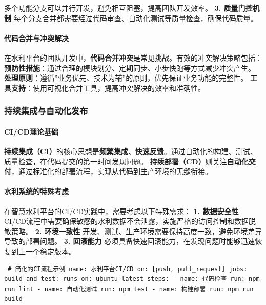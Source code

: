 多个功能分支可以并行开发，避免相互阻塞，提高团队开发效率。 \textbf{3. 质量门控机制} 每个分支合并都需要经过代码审查、自动化测试等质量检查，确保代码质量。 \paragraph{代码合并与冲突解决}\label{ux4ee3ux7801ux5408ux5e76ux4e0eux51b2ux7a81ux89e3ux51b3} 在水利平台的团队开发中，\textbf{代码合并冲突}是常见挑战。有效的冲突解决策略包括： \textbf{预防性措施}：通过合理的模块划分、定期同步、小步快跑等方式减少冲突产生。 \textbf{处理原则}：遵循''业务优先、技术为辅''的原则，优先保证业务功能的完整性。 \textbf{工具支持}：使用可视化合并工具，提高冲突解决的效率和准确性。 \subsubsection{持续集成与自动化发布}\label{ux6301ux7eedux96c6ux6210ux4e0eux81eaux52a8ux5316ux53d1ux5e03} \paragraph{CI/CD理论基础}\label{cicdux7406ux8bbaux57faux7840} \textbf{持续集成（CI）}的核心思想是\textbf{频繁集成、快速反馈}。通过自动化的构建、测试、质量检查，在代码提交的第一时间发现问题。 \textbf{持续部署（CD）}则关注\textbf{自动化交付}，通过标准化的部署流程，实现从代码到生产环境的无缝衔接。 \paragraph{水利系统的特殊考虑}\label{ux6c34ux5229ux7cfbux7edfux7684ux7279ux6b8aux8003ux8651} 在智慧水利平台的CI/CD实践中，需要考虑以下特殊需求： \textbf{1. 数据安全性} CI/CD流程中需要确保敏感的水利数据不会泄露，实施严格的访问控制和数据脱敏策略。 \textbf{2. 环境一致性} 开发、测试、生产环境需要保持高度一致，避免环境差异导致的部署问题。 \textbf{3. 回滚能力} 必须具备快速回滚能力，在发现问题时能够迅速恢复到上一个稳定版本。 \begin{verbatim} # 简化的CI流程示例 name: 水利平台CI/CD on: [push, pull_request] jobs: build-and-test: runs-on: ubuntu-latest steps: - name: 代码检查 run: npm run lint - name: 自动化测试 run: npm test - name: 构建部署 run: npm run build \end{verbatim} 